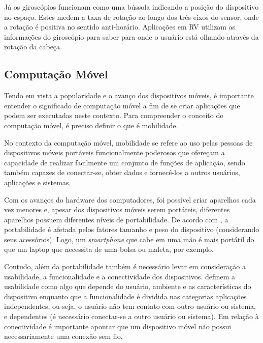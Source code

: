 Já os giroscópios funcionam como uma bússola indicando a posição do dispositivo no espaço. Estes medem a taxa de rotação ao longo dos três eixos do sensor, onde a rotação é positiva no sentido anti-horário. Aplicações em RV utilizam as informações do giroscópio para saber para onde o usuário está olhando através da rotação da cabeça. \cite{android}

\subsection{Computação Móvel}
\label{ss.computacaomovel}

Tendo em vista a popularidade e o avanço dos dispositivos móveis, é importante entender o significado de computação móvel a fim de se criar aplicações que podem ser executadas neste contexto. Para compreender o conceito de computação móvel, é preciso definir o que é mobilidade.

\begin{citacao}
	No contexto da computação móvel, mobilidade se refere ao uso pelas pessoas de dispositivos móveis portáveis funcionalmente poderosos que ofereçam a capacidade de realizar facilmente um conjunto de funções de aplicação, sendo também capazes de conectar-se, obter dados e fornecê-los a outros usuários, aplicações e sistemas. \cite[p. ~1]{lee}
\end{citacao}

Com os avanços do hardware dos computadores, foi possível criar aparelhos cada vez menores e, apesar dos dispositivos móveis serem portáteis, diferentes aparelhos possuem diferentes níveis de portabilidade. De acordo com , a portabilidade é afetada pelos fatores tamanho e peso do dispositivo (considerando seus acessórios). Logo, um \textit{smartphone} que cabe em uma mão é mais portátil do que um laptop que necessita de uma bolsa ou maleta, por exemplo. 

Contudo, além da portabilidade também é necessário levar em consideração a usabilidade, a funcionalidade e a conectividade dos dispositivos.  definem a usabilidade como algo que depende do usuário, ambiente e as características do dispositivo enquanto que a funcionalidade é dividida nas categorias aplicações independentes, ou seja, o usuário não tem contato com outro usuário ou sistema, e dependentes (é necessário conectar-se a outro usuário ou sistema). Em relação à conectividade é importante apontar que um dispositivo móvel não possui necessariamente uma conexão sem fio.

